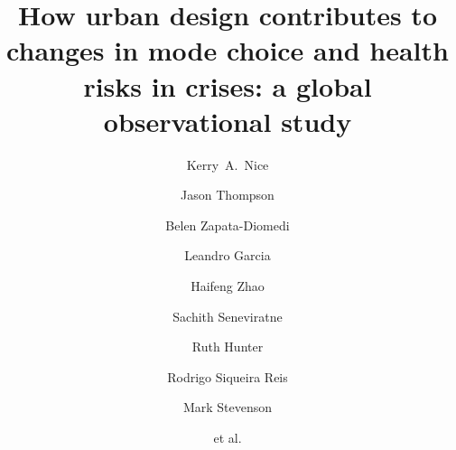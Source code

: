 \documentclass[preprint,12pt]{elsarticle}
\begin{document}
\begin{frontmatter}



\title{How urban design contributes to changes in mode choice and health risks in crises: a global observational study}


\author[melb]{Kerry~A.~Nice}
\author[melb]{Jason Thompson}
\author[melb]{Belen Zapata-Diomedi}
\author[melb]{Leandro Garcia}
\author[melb]{Haifeng Zhao}
\author[melb]{Sachith Seneviratne}
\author[melb]{Ruth Hunter}
\author[melb]{Rodrigo Siqueira Reis}
\author[melb]{Mark Stevenson}
\author[melb]{et al.}

\address[melb]{Transport, Health, and Urban Design Research Lab, Faculty of Architecture, Building, and Planning, University of Melbourne, VIC, Australia.}



\end{frontmatter}
\end{document}

